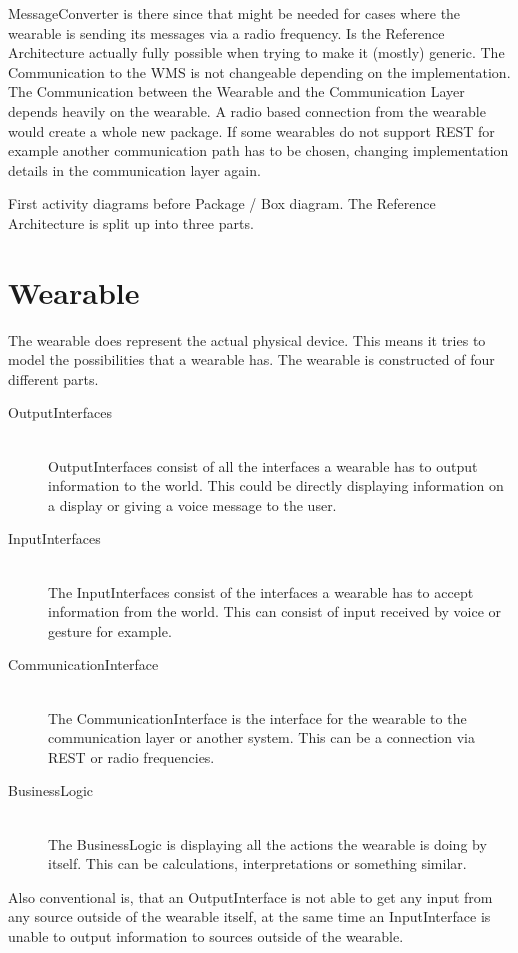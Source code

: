\documentclass{report}
\begin{document}
MessageConverter is there since that might be needed for cases where the wearable is sending its messages via a radio frequency.
Is the Reference Architecture actually fully possible when trying to make it (mostly) generic.
The Communication to the WMS is not changeable depending on the implementation. The Communication between the Wearable and the Communication Layer depends heavily on the wearable. A radio based connection from the wearable would create a whole new package. If some wearables do not support REST for example another communication path has to be chosen, changing implementation details in the communication layer again.

First activity diagrams before Package / Box diagram.
The Reference Architecture is split up into three parts.
\section{Wearable}
The wearable does represent the actual physical device. This means it tries to model the possibilities that a wearable has. The wearable is constructed of four different parts.
\begin{description}
	\item[OutputInterfaces] \hfill \\
	OutputInterfaces consist of all the interfaces a wearable has to output information to the world. This could be directly displaying information on a display or giving a voice message to the user.
	\item[InputInterfaces] \hfill \\
	The InputInterfaces consist of the interfaces a wearable has to accept information from the world. This can consist of input received by voice or gesture for example.
	\item[CommunicationInterface] \hfill \\
	The CommunicationInterface is the interface for the wearable to the communication layer or another system. This can be a connection via REST or radio frequencies.
	\item[BusinessLogic] \hfill \\
	The BusinessLogic is displaying all the actions the wearable is doing by itself. This can be calculations, interpretations or something similar.
\end{description}

Also conventional is, that an OutputInterface is not able to get any input from any source outside of the wearable itself, at the same time an InputInterface is unable to output information to sources outside of the wearable.
\end{document}
